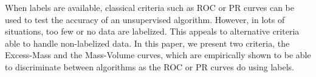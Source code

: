 \label{workshop:chap}

\begin{chapabstract}
When labels are available, classical criteria such as ROC or PR curves can be used to test the accuracy of an unsupervised algorithm. However, in lots of situations, too few or no data are labelized. This appeals to alternative criteria able to handle non-labelized data. In this paper, we present two criteria, the Excess-Mass and the Mass-Volume curves, which are empirically shown to be able to discriminate between algorithms as the ROC or PR curves do using labels.
\end{chapabstract}
